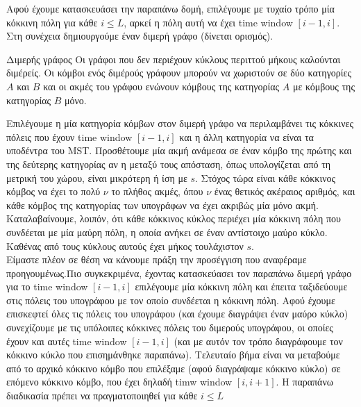 \documentclass[oneside,12pt]{book}
\theoremstyle{definition}
\begin{document}
Αφού έχουμε κατασκευάσει την παραπάνω δομή, επιλέγουμε με τυχαίο τρόπο μία κόκκινη πόλη για κάθε \(i \leq L\), αρκεί η πόλη αυτή να έχει time window \([i-1,i]\). Στη συνέχεια δημιουργούμε έναν διμερή γράφο (δίνεται ορισμός).

\begin{mydefinition}{Διμερής γράφος}{}
	Οι γράφοι που δεν περιέχουν κύκλους περιττού μήκους καλούνται διμέρείς. Οι κόμβοι ενός διμέρούς γράφουν μπορούν να χωριστούν σε δύο κατηγορίες \(Α\) και \(Β\) και οι ακμές του γράφου ενώνουν κόμβους της κατηγορίας \(A\) με κόμβους της κατηγορίας \(B\) μόνο.
\end{mydefinition}

Επιλέγουμε η μία κατηγορία κόμβων στον διμερή γράφο να περιλαμβάνει τις κόκκινες πόλεις που έχουν time window \([i-1,i]\) και η άλλη κατηγορία να είναι τα υποδέντρα του MST. Προσθέτουμε μία ακμή ανάμεσα σε έναν κόμβο της πρώτης και της δεύτερης κατηγορίας αν η μεταξύ τους απόσταση, όπως υπολογίζεται από τη μετρική του χώρου, είναι μικρότερη ή ίση με \(s\). Στόχος τώρα είναι κάθε κόκκινος κόμβος να έχει το πολύ \(ν\) το πλήθος ακμές, όπου \(ν\) ένας θετικός ακέραιος αριθμός, και κάθε κόμβος της κατηγορίας των υπογράφων να έχει ακριβώς μία μόνο ακμή. \\

Καταλαβαίνουμε, λοιπόν, ότι κάθε κόκκινος κύκλος περιέχει μία κόκκινη πόλη που συνδέεται με μία μαύρη πόλη, η οποία ανήκει σε έναν αντίστοιχο μαύρο κύκλο. Καθένας από τους κύκλους αυτούς έχει μήκος τουλάχιστον \(s\). \\

Είμαστε πλέον σε θέση να κάνουμε πράξη την προσέγγιση που αναφέραμε προηγουμένως.Πιο συγκεκριμένα, έχοντας κατασκεύασει τον παραπάνω διμερή γράφο για το time window \([i-1,i]\) επιλέγουμε μία κόκκινη πόλη και έπειτα ταξιδεύουμε στις πόλεις του υπογράφου με τον οποίο συνδέεται η κόκκινη πόλη. Αφού έχουμε επισκεφτεί όλες τις πόλεις του υπογράφου (και έχουμε διαγράψει έναν μαύρο κύκλο) συνεχίζουμε με τις υπόλοιπες κόκκινες πόλεις του διμερούς υπογράφου, οι οποίες έχουν και αυτές time window \([i-1,i]\) (και με αυτόν τον τρόπο διαγράφουμε τον κόκκινο κύκλο που επισημάνθηκε παραπάνω). Τελευταίο βήμα είναι να μεταβούμε από το αρχικό κόκκινο κόμβο που επιλέξαμε (αφού διαγράψαμε κόκκινο κύκλο) σε επόμενο κόκκινο κόμβο, που έχει δηλαδή timw window \([i,i+1]\). Η παραπάνω διαδικασία πρέπει να πραγματοποιηθεί για κάθε \(i \leq L\)\\
\end{document}
